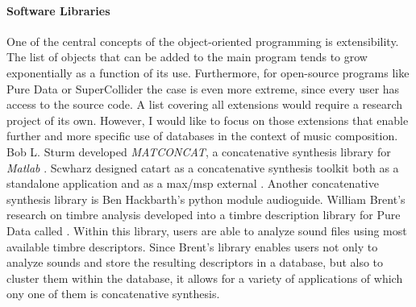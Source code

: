 {	\paragraph{Software Libraries}
	One of the central concepts of the object-oriented programming is extensibility. The list of objects that can be added to the main program tends to grow exponentially as a function of its use. Furthermore, for open-source programs like Pure Data or SuperCollider the case is even more extreme, since every user has access to the source code. A list covering all extensions would require a research project of its own. However, I would like to focus on those extensions that enable further and more specific use of databases in the context of music composition. Bob L. Sturm developed \textit{MATCONCAT}, a concatenative synthesis library for \textit{Matlab} \parencite{Stu04:Mat}. Scwharz designed \gls{catart} as a concatenative synthesis toolkit both as a standalone application and as a \gls{max/msp} external \parencite{Sch06:Rea}. Another concatenative synthesis library is Ben Hackbarth's python module \gls{audioguide}. William Brent's research on timbre analysis developed into a timbre description library for Pure Data called \parencite{icmc/bbp2372.2010.044}. Within this library, users are able to analyze sound files using most available timbre descriptors. Since Brent's library enables users not only to analyze sounds and store the resulting descriptors in a database, but also to cluster them within the database, it allows for a variety of applications of which ony one of them is concatenative synthesis.
}
